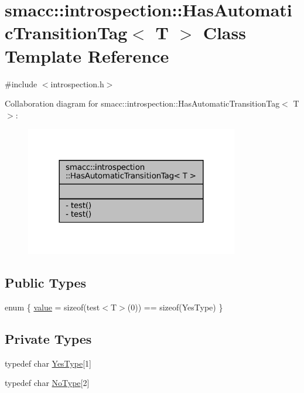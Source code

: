\hypertarget{classsmacc_1_1introspection_1_1HasAutomaticTransitionTag}{}\section{smacc\+:\+:introspection\+:\+:Has\+Automatic\+Transition\+Tag$<$ T $>$ Class Template Reference}
\label{classsmacc_1_1introspection_1_1HasAutomaticTransitionTag}


{\ttfamily \#include $<$introspection.\+h$>$}



Collaboration diagram for smacc\+:\+:introspection\+:\+:Has\+Automatic\+Transition\+Tag$<$ T $>$\+:
\nopagebreak
\begin{figure}[H]
\begin{center}
\leavevmode
\includegraphics[width=264pt]{classsmacc_1_1introspection_1_1HasAutomaticTransitionTag__coll__graph}
\end{center}
\end{figure}
\subsection*{Public Types}
\begin{DoxyCompactItemize}
\item 
enum \{ \hyperlink{classsmacc_1_1introspection_1_1HasAutomaticTransitionTag_aa4d176f174bc660b4705a0ff3874d4aca4e813bb149aec14797ea59791542e845}{value} = sizeof(test$<$T$>$(0)) == sizeof(Yes\+Type)
 \}
\end{DoxyCompactItemize}
\subsection*{Private Types}
\begin{DoxyCompactItemize}
\item 
typedef char \hyperlink{classsmacc_1_1introspection_1_1HasAutomaticTransitionTag_a750a08a185de0fa20331ba7cfc531dde}{Yes\+Type}\mbox{[}1\mbox{]}
\item 
typedef char \hyperlink{classsmacc_1_1introspection_1_1HasAutomaticTransitionTag_ab81e7f76862ba064df3fd8e78b3864c4}{No\+Type}\mbox{[}2\mbox{]}
\end{DoxyCompactItemize}
